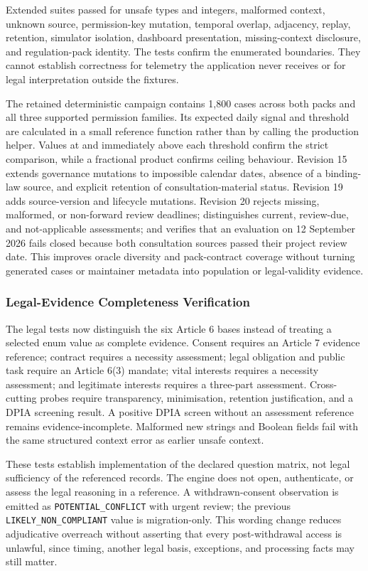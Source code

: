 Extended suites passed for unsafe types and integers, malformed context, unknown source, permission-key mutation, temporal overlap, adjacency, replay, retention, simulator isolation, dashboard presentation, missing-context disclosure, and regulation-pack identity. The tests confirm the enumerated boundaries. They cannot establish correctness for telemetry the application never receives or for legal interpretation outside the fixtures.

The retained deterministic campaign contains 1,800 cases across both packs and all three supported permission families. Its expected daily signal and threshold are calculated in a small reference function rather than by calling the production helper. Values at and immediately above each threshold confirm the strict comparison, while a fractional product confirms ceiling behaviour. Revision 15 extends governance mutations to impossible calendar dates, absence of a binding-law source, and explicit retention of consultation-material status. Revision 19 adds source-version and lifecycle mutations. Revision 20 rejects missing, malformed, or non-forward review deadlines; distinguishes current, review-due, and not-applicable assessments; and verifies that an evaluation on 12 September 2026 fails closed because both consultation sources passed their project review date. This improves oracle diversity and pack-contract coverage without turning generated cases or maintainer metadata into population or legal-validity evidence.

\subsubsection{Legal-Evidence Completeness Verification}

The legal tests now distinguish the six Article 6 bases instead of treating a selected enum value as complete evidence. Consent requires an Article 7 evidence reference; contract requires a necessity assessment; legal obligation and public task require an Article 6(3) mandate; vital interests requires a necessity assessment; and legitimate interests requires a three-part assessment. Cross-cutting probes require transparency, minimisation, retention justification, and a DPIA screening result. A positive DPIA screen without an assessment reference remains evidence-incomplete. Malformed new strings and Boolean fields fail with the same structured context error as earlier unsafe context.

These tests establish implementation of the declared question matrix, not legal sufficiency of the referenced records. The engine does not open, authenticate, or assess the legal reasoning in a reference. A withdrawn-consent observation is emitted as \texttt{POTENTIAL\_CONFLICT} with urgent review; the previous \texttt{LIKELY\_NON\_COMPLIANT} value is migration-only. This wording change reduces adjudicative overreach without asserting that every post-withdrawal access is unlawful, since timing, another legal basis, exceptions, and processing facts may still matter.

